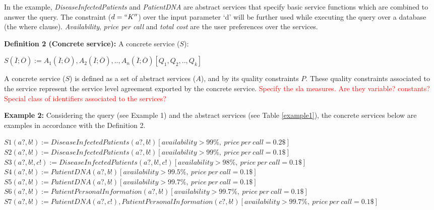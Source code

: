 In the example, \textit{DiseaseInfectedPatients} and \textit{PatientDNA} are abstract services that specify basic service functions which are combined to answer the query. 
The constraint ($d = ``K''$) over the input parameter `d' will be further used while executing the query over a database (the where clause). 
\textit{Availability}, \textit{price per call} and \textit{total cost} are the user preferences over the services.

\noindent \textbf{Definition 2 (Concrete service):} A concrete service ($S$):
\begin{center}
$S (\overline{I}; \overline{O}) := A_{1}(\overline{I}; \overline{O}), A_{2}(\overline{I}; \overline{O}), ..,  A_{n}(\overline{I}; \overline{O})[Q_{1},Q_{2}, .., Q_{k}]$
\end{center}  
A concrete service ($S$) is defined as a set of abstract services ($A$), and by its quality constraints $P$. 
These quality constraints associated to the service represent the service level agreement exported by the concrete service. \textcolor{red}{Specify the sla measures. Are they variable? constants? Special class of identifiers associated to the services?}

\noindent \textbf{Example 2:} Considering the query (see Example 1) and the abstract services (see Table \ref{example1}), the concrete services below are examples in accordance with the Definition 2.

\begin{flushleft}
$S1 (a?, b!) := DiseaseInfectedPatients(a?, b!)[availability > 99\%, \ price \ per \ call = 0.2\$]$ \\
$S2 (a?, b!) := DiseaseInfectedPatients(a?, b!)[availability > 99\%, \ price \ per \ call = 0.1\$]$ \\
$S3 (a?, b!, c!) := DiseaseInfectedPatients(a?, b!, c!)[availability > 98\%, \ price \ per \ call = 0.1\$]$ \\
$S4 (a?, b!) := PatientDNA(a?, b!)[availability > 99.5\%, \ price \ per \ call = 0.1\$]$ \\
$S5 (a?, b!) := PatientDNA(a?, b!)[availability > 99.7\%, \ price \ per \ call = 0.1\$]$ \\
$S6 (a?, b!) := PatientPersonalInformation(a?, b!)[availability > 99.7\%, \ price \ per \ call = 0.1\$]$ \\
$S7 (a?, b!) := PatientDNA(a?, c!),PatientPersonalInformation(c?, b!)[availability > 99.7\%, \ price \ per \ call = 0.1\$]$ \\
\end{flushleft}

